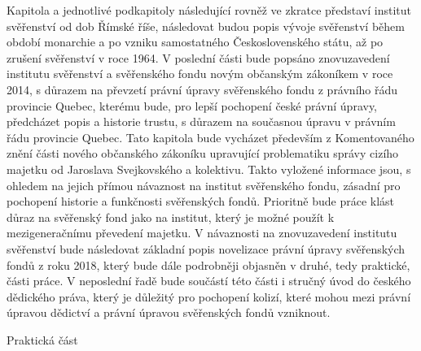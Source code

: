 \documentclass{article}
\begin{document}
Kapitola a jednotlivé podkapitoly následující rovněž ve zkratce představí institut svěřenství od dob Římské říše, následovat budou popis vývoje svěřenství během období monarchie a po vzniku samostatného Československého státu, až po zrušení svěřenství v roce 1964. V poslední části bude popsáno znovuzavedení institutu svěřenství a svěřenského fondu novým občanským zá\-koníkem v roce 2014, s důrazem na převzetí právní úpravy svěřenského fondu z právního řádu provincie Quebec, kterému bude, pro lepší pochopení české právní úpravy, předcházet popis a historie trustu, s důrazem na současnou úpravu v právním řádu provincie Quebec. Tato kapitola bude vycházet především z Komentovaného znění části nového občanského zákoníku upravující problematiku správy cizího majetku od Jaroslava Svejkovského a kolektivu. Takto vyložené informace jsou, s ohledem na jejich přímou návaznost na institut svěřenského fondu, zásadní pro pochopení historie a funkčnosti svěřenských fondů. Prioritně bude práce klást důraz na svěřenský fond jako na institut, který je možné použít k mezigeneračnímu převedení majetku. V návaznosti na znovuzavedení institutu svěřenství bude následovat základní popis novelizace právní úpravy svěřenských fondů z roku 2018, který bude dále podrobněji objasněn v druhé, tedy praktické, části práce. V neposlední řadě bude součástí této části i stručný úvod do českého dědického práva, který je důležitý pro pochopení kolizí, které mohou mezi právní úpravou dědictví a právní úpravou svěřenských fondů vzniknout.\\


\newpage

{\Large Praktická část}\\
\end{document}

